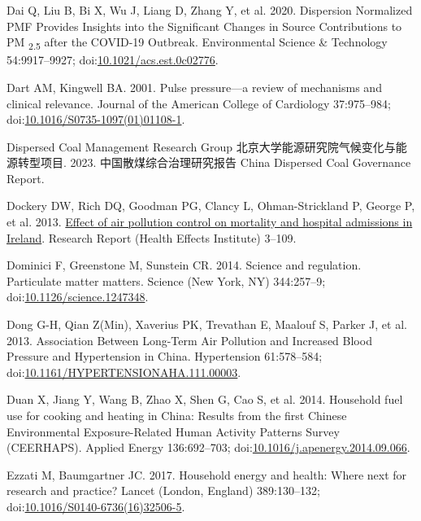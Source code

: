 \documentclass[
  letterpaper,
  DIV=11,
  numbers=noendperiod]{scrartcl}
\newlength{\cslhangindent}
\newlength{\cslentryspacingunit} %
\newenvironment{CSLReferences}[2] %
 {%
  \setlength{\parindent}{0pt}
  \ifodd #1
  \let\oldpar\par
  \def\par{\hangindent=\cslhangindent\oldpar}
  \fi
  \setlength{\parskip}{#2\cslentryspacingunit}
 }%
 {}
\begin{document}
\begin{CSLReferences}{1}{0}
\leavevmode{}%
Dai Q, Liu B, Bi X, Wu J, Liang D, Zhang Y, et al. 2020. Dispersion
{Normalized PMF Provides Insights} into the {Significant Changes} in
{Source Contributions} to {PM} {\textsubscript{2.5}} after the {COVID-19
Outbreak}. Environmental Science \& Technology 54:9917--9927;
doi:\href{https://doi.org/10.1021/acs.est.0c02776}{10.1021/acs.est.0c02776}.

\leavevmode{}%
Dart AM, Kingwell BA. 2001. Pulse pressure---a review of mechanisms and
clinical relevance. Journal of the American College of Cardiology
37:975--984;
doi:\href{https://doi.org/10.1016/S0735-1097(01)01108-1}{10.1016/S0735-1097(01)01108-1}.

\leavevmode{}%
Dispersed Coal Management Research Group
北京大学能源研究院气候变化与能源转型项目. 2023. 中国散煤综合治理研究报告
{China Dispersed Coal Governance Report}.

\leavevmode{}%
Dockery DW, Rich DQ, Goodman PG, Clancy L, Ohman-Strickland P, George P,
et al. 2013. \href{https://www.ncbi.nlm.nih.gov/pubmed/24024358}{Effect
of air pollution control on mortality and hospital admissions in
{Ireland}}. Research Report (Health Effects Institute) 3--109.

\leavevmode{}%
Dominici F, Greenstone M, Sunstein CR. 2014. Science and regulation.
{Particulate} matter matters. Science (New York, NY) 344:257--9;
doi:\href{https://doi.org/10.1126/science.1247348}{10.1126/science.1247348}.

\leavevmode{}%
Dong G-H, Qian Z(Min), Xaverius PK, Trevathan E, Maalouf S, Parker J, et
al. 2013. Association {Between Long-Term Air Pollution} and {Increased
Blood Pressure} and {Hypertension} in {China}. Hypertension 61:578--584;
doi:\href{https://doi.org/10.1161/HYPERTENSIONAHA.111.00003}{10.1161/HYPERTENSIONAHA.111.00003}.

\leavevmode{}%
Duan X, Jiang Y, Wang B, Zhao X, Shen G, Cao S, et al. 2014. Household
fuel use for cooking and heating in {China}: {Results} from the first
{Chinese Environmental Exposure-Related Human Activity Patterns Survey}
({CEERHAPS}). Applied Energy 136:692--703;
doi:\href{https://doi.org/10.1016/j.apenergy.2014.09.066}{10.1016/j.apenergy.2014.09.066}.

\leavevmode{}%
Ezzati M, Baumgartner JC. 2017. Household energy and health: Where next
for research and practice? Lancet (London, England) 389:130--132;
doi:\href{https://doi.org/10.1016/S0140-6736(16)32506-5}{10.1016/S0140-6736(16)32506-5}.


\end{CSLReferences}
\end{document}
